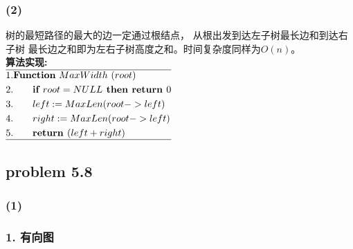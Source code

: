 \documentclass[11pt,a4paper,oneside,oldfontcommands]{ctexart}
\begin{document}
\subsubsection*{(2)}
\noindent 树的最短路径的最大的边一定通过根结点，
从根出发到达左子树最长边和到达右子树
最长边之和即为左右子树高度之和。时间复杂度同样为$O(n)$。\\
\textbf{算法实现:}\\
$
	\begin{aligned}
		\hline
		 & 1.\textbf{Function}\ {MaxWidth}\ (root)                      \\
		 & 2.\hspace*{20pt}\textbf{if }root=NULL\textbf{ then return }0 \\
		 & 3.\hspace*{20pt}left:=MaxLen(root->left)                     \\
		 & 4.\hspace*{20pt}right:=MaxLen(root->left)                    \\
		 & 5.\hspace*{20pt}\textbf{return }(left+right)                 \\
		\hline
	\end{aligned}
$
{\subsection*{problem 5.8}}
\subsubsection*{(1)}
\subsubsection*{1. 有向图}
\end{document}

